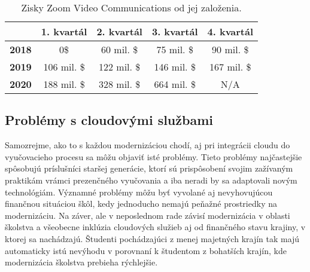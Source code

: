 \documentclass[10pt,slovak,a4paper]{article}%
\begin{document}
\begin{table}[h]
\centering
\begin{tabular}{|l|c|c|c|c|}
\hline
              & \multicolumn{1}{l|}{\textbf{1. kvartál}} & \multicolumn{1}{l|}{\textbf{2. kvartál}} & \multicolumn{1}{l|}{\textbf{3. kvartál}} & \multicolumn{1}{l|}{\textbf{4. kvartál}} \\ \hline
\textbf{2018} & 0\$                                      & 60 mil. \$                               & 75 mil. \$                               & 90 mil. \$                               \\ \hline
\textbf{2019} & 106 mil. \$                              & 122 mil. \$                              & 146 mil. \$                              & 167 mil. \$                              \\ \hline
\textbf{2020} & \cellcolor[HTML]{FFCCC9}188 mil. \$      & \cellcolor[HTML]{FFCCC9}328 mil. \$      & \cellcolor[HTML]{FFCCC9}664 mil. \$      & N/A                                      \\ \hline
\end{tabular}
\caption{Zisky Zoom Video Communications od jej založenia.}
\end{table}


\subsection{Problémy s cloudovými službami}

Samozrejme, ako to s každou modernizáciou chodí, aj pri integrácii cloudu do vyučovacieho procesu sa môžu objaviť isté problémy. Tieto problémy najčastejšie spôsobujú príslušníci staršej generácie, ktorí sú prispôsobení svojim zažívaným praktikám vrámci prezenčného vyučovania a iba neradi by sa adaptovali novým technológiám. Významné problémy môžu byť vyvolané aj nevyhovujúcou finančnou situáciou škôl, kedy jednoducho nemajú peňažné prostriedky na modernizáciu. Na záver, ale v neposlednom rade závisí modernizácia v oblasti školstva a všeobecne inklúzia cloudových služieb aj od finančného stavu krajiny, v ktorej sa nachádzajú. Študenti pochádzajúci z menej majetných krajín tak majú automaticky istú nevýhodu v porovnaní k študentom z bohatších krajín, kde modernizácia školstva prebieha rýchlejšie.
\end{document}
